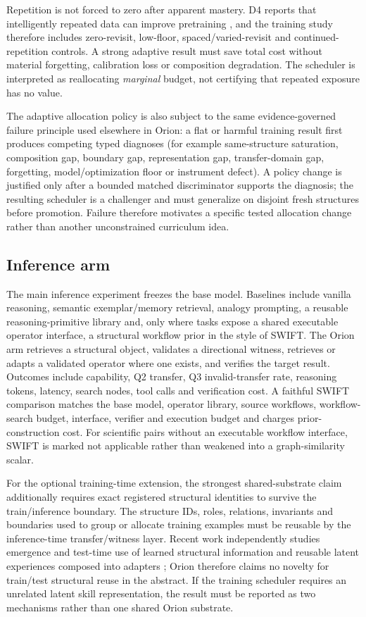 Repetition is not forced to zero after apparent mastery. D4 reports that intelligently repeated data can improve pretraining \cite{tirumala2023d4}, and the training study therefore includes zero-revisit, low-floor, spaced/varied-revisit and continued-repetition controls. A strong adaptive result must save total cost without material forgetting, calibration loss or composition degradation. The scheduler is interpreted as reallocating \emph{marginal} budget, not certifying that repeated exposure has no value.

The adaptive allocation policy is also subject to the same evidence-governed failure principle used elsewhere in Orion: a flat or harmful training result first produces competing typed diagnoses (for example same-structure saturation, composition gap, boundary gap, representation gap, transfer-domain gap, forgetting, model/optimization floor or instrument defect). A policy change is justified only after a bounded matched discriminator supports the diagnosis; the resulting scheduler is a challenger and must generalize on disjoint fresh structures before promotion. Failure therefore motivates a specific tested allocation change rather than another unconstrained curriculum idea.

\subsection{Inference arm}

The main inference experiment freezes the base model. Baselines include vanilla reasoning, semantic exemplar/memory retrieval, analogy prompting, a reusable reasoning-primitive library and, only where tasks expose a shared executable operator interface, a structural workflow prior in the style of SWIFT. The Orion arm retrieves a structural object, validates a directional witness, retrieves or adapts a validated operator where one exists, and verifies the target result. Outcomes include capability, Q2 transfer, Q3 invalid-transfer rate, reasoning tokens, latency, search nodes, tool calls and verification cost. A faithful SWIFT comparison matches the base model, operator library, source workflows, workflow-search budget, interface, verifier and execution budget and charges prior-construction cost. For scientific pairs without an executable workflow interface, SWIFT is marked not applicable rather than weakened into a graph-similarity scalar.

For the optional training-time extension, the strongest shared-substrate claim additionally requires exact registered structural identities to survive the train/inference boundary. The structure IDs, roles, relations, invariants and boundaries used to group or allocate training examples must be reusable by the inference-time transfer/witness layer. Recent work independently studies emergence and test-time use of learned structural information \cite{chen2026structure} and reusable latent experiences composed into adapters \cite{ling2026rex}; Orion therefore claims no novelty for train/test structural reuse in the abstract. If the training scheduler requires an unrelated latent skill representation, the result must be reported as two mechanisms rather than one shared Orion substrate.

